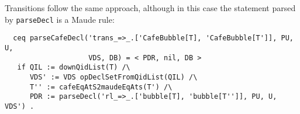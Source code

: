 {\codesize
\begin{comment}
  ceq parseCafeDecl('cq_=_if_.['CafeBubble[T], 'CafeBubble[T'], 'CafeBubble[T'']], PU, U,
                    VDS, DB) = < PDR, nil, DB >
   if QIL := downQidList(T) /\
      VDS' := VDS opDeclSetFromQidList(QIL) /\
      T''' := cafeEqAtS2maudeEqAts(T'') /\
      PDR := parseDecl('ceq_=_if_.['bubble[T], 'bubble[T'], 'bubble[T''']], PU, U, VDS') .

  ceq parseCafeDecl('bceq_=_if_.['CafeBubble[T], 'CafeBubble[T'], 'CafeBubble[T'']], PU, U,
                    VDS, DB) = < PDR, nil, DB >
   if QIL := downQidList(T) /\
      VDS' := VDS opDeclSetFromQidList(QIL) /\
      T''' := cafeEqAtS2maudeEqAts(T'') /\
      PDR := parseDecl('ceq_=_if_.['bubble[T], 'bubble[T'], 'bubble[T''']], PU, U, VDS') .

  ceq parseCafeDecl('bcq_=_if_.['CafeBubble[T], 'CafeBubble[T'], 'CafeBubble[T'']], PU, U,
                    VDS, DB) = < PDR, nil, DB >
   if QIL := downQidList(T) /\
      VDS' := VDS opDeclSetFromQidList(QIL) /\
      T''' := cafeEqAtS2maudeEqAts(T'') /\
      PDR := parseDecl('ceq_=_if_.['bubble[T], 'bubble[T'], 'bubble[T''']], PU, U, VDS') .
\end{comment}
}

Transitions follow the same approach, although in this case the statement parsed
by \verb"parseDecl" is a Maude rule:

{\codesize
\begin{verbatim}
  ceq parseCafeDecl('trans_=>_.['CafeBubble[T], 'CafeBubble[T']], PU, U,
                    VDS, DB) = < PDR, nil, DB >
   if QIL := downQidList(T) /\
      VDS' := VDS opDeclSetFromQidList(QIL) /\
      T'' := cafeEqAtS2maudeEqAts(T') /\
      PDR := parseDecl('rl_=>_.['bubble[T], 'bubble[T'']], PU, U, VDS') .
\end{verbatim}
}

